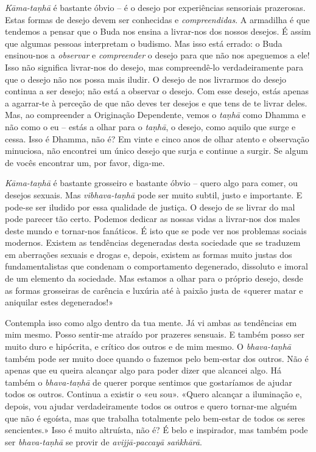 \emph{Kāma-taṇhā} é bastante óbvio -- é o desejo por experiências sensoriais
prazerosas. Estas formas de desejo devem ser conhecidas e \emph{compreendidas}.
A armadilha é que tendemos a pensar que o Buda nos ensina a livrar-nos dos
nossos desejos. É assim que algumas pessoas interpretam o budismo. Mas isso está
errado: o Buda ensinou-nos a \emph{observar} e \emph{compreender} o desejo para
que não nos apeguemos a ele! Isso não significa livrar-nos do desejo, mas
compreendê-lo verdadeiramente para que o desejo não nos possa mais iludir. O
desejo de nos livrarmos do desejo continua a ser desejo; não está a observar o
desejo. Com esse desejo, estás apenas a agarrar-te à perceção de que não deves
ter desejos e que tens de te livrar deles. Mas, ao compreender a Originação
Dependente, vemos o \emph{taṇhā} como Dhamma e não como o eu -- estás a olhar
para o \emph{taṇhā}, o desejo, como aquilo que surge e cessa. Isso é Dhamma, não é? Em
vinte e cinco anos de olhar atento e observação minuciosa, não encontrei um
único desejo que surja e continue a surgir. Se algum de vocês encontrar um, por
favor, diga-me.

\emph{Kāma-taṇhā} é bastante grosseiro e bastante óbvio -- quero algo para
comer, ou desejos sexuais. Mas \emph{vibhava-taṇhā} pode ser muito subtil,
justo e importante. E pode-se ser iludido por essa qualidade de justiça. O
desejo de se livrar do mal pode parecer tão certo. Podemos dedicar as nossas
vidas a livrar-nos dos males deste mundo e tornar-nos fanáticos. É isto que se
pode ver nos problemas sociais modernos. Existem as tendências degeneradas desta
sociedade que se traduzem em aberrações sexuais e drogas e, depois, existem as
formas muito justas dos fundamentalistas que condenam o comportamento
degenerado, dissoluto e imoral de um elemento da sociedade. Mas estamos a olhar
para o próprio desejo, desde as formas grosseiras de carência e luxúria até à
paixão justa de «querer matar e aniquilar estes degenerados!»

Contempla isso como algo dentro da tua mente. Já vi ambas as tendências em mim
mesmo. Posso sentir-me atraído por prazeres sensuais. E também posso ser muito
duro e hipócrita, e crítico dos outros e de mim mesmo. O \emph{bhava-taṇhā}
também pode ser muito doce quando o fazemos pelo bem-estar dos outros. Não é
apenas que eu queira alcançar algo para poder dizer que alcancei algo. Há também
o \emph{bhava-taṇhā} de querer porque sentimos que gostaríamos de ajudar todos
os outros. Continua a existir o «eu sou». «Quero alcançar a iluminação e,
depois, vou ajudar verdadeiramente todos os outros e quero tornar-me alguém que
não é egoísta, mas que trabalha totalmente pelo bem-estar de todos os seres
sencientes.» Isso é muito altruísta, não é? É belo e inspirador, mas também pode
ser \emph{bhava-taṇhā} se provir de \emph{avijjā-paccayā saṅkhārā}.

